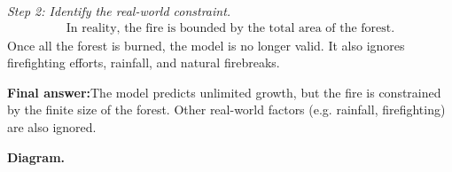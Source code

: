 \documentclass[11pt]{article}
\begin{document}
\textit{Step 2: Identify the real-world constraint.}
\[\begin{gathered}
\text{In reality, the fire is bounded by the total area of the forest.}
\end{gathered}\]
Once all the forest is burned, the model is no longer valid. It also ignores firefighting efforts, rainfall, and natural firebreaks.

\begin{answerbox}
\textbf{Final answer:}\quad The model predicts unlimited growth, but the fire is constrained by the finite size of the forest. Other real-world factors (e.g. rainfall, firefighting) are also ignored.
\end{answerbox}
\textbf{Diagram.}

\begin{center}
\end{center}
\end{document}
